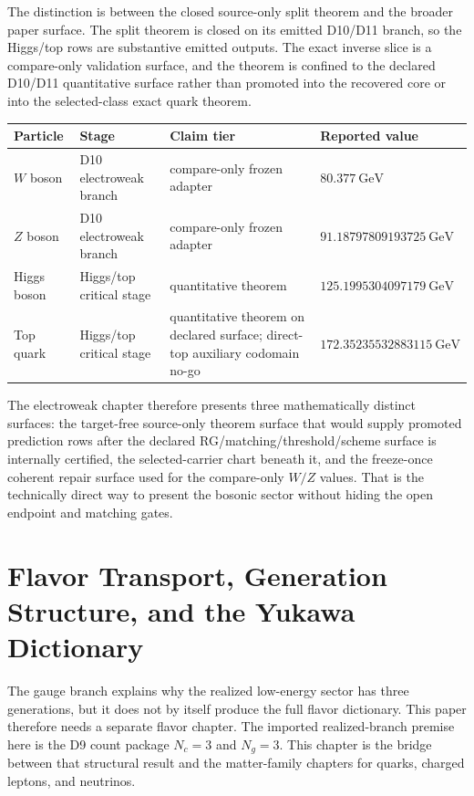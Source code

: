 \documentclass[11pt]{article}
\begin{document}
The distinction is between the closed source-only split theorem and the broader paper surface. The
split theorem is closed on its emitted D10/D11 branch, so the Higgs/top rows are
substantive emitted outputs. The exact inverse slice is a compare-only validation surface, and the theorem is confined to the declared D10/D11 quantitative surface rather than promoted into the recovered core or into the selected-class exact quark theorem.

\begin{table}[h]
\centering
\small
\begin{tabular}{@{}llll@{}}
\toprule
Particle & Stage & Claim tier & Reported value \\
\midrule
\(W\) boson & D10 electroweak branch & compare-only frozen adapter & \(80.377~\mathrm{GeV}\) \\
\(Z\) boson & D10 electroweak branch & compare-only frozen adapter & \(91.18797809193725~\mathrm{GeV}\) \\
Higgs boson & Higgs/top critical stage & quantitative theorem & \(125.1995304097179~\mathrm{GeV}\) \\
Top quark & Higgs/top critical stage & quantitative theorem on declared surface; direct-top auxiliary codomain no-go & \(172.35235532883115~\mathrm{GeV}\) \\
\bottomrule
\end{tabular}
\end{table}

The electroweak chapter therefore presents three mathematically distinct surfaces: the target-free
source-only theorem surface that would supply promoted prediction rows after the declared RG/matching/threshold/scheme surface is internally certified, the selected-carrier chart
beneath it, and the freeze-once coherent repair surface used for the compare-only \(W/Z\)
values. That is the technically direct way to present the bosonic sector without hiding the open
endpoint and matching gates.

\section{Flavor Transport, Generation Structure, and the Yukawa Dictionary}

The gauge branch explains why the realized low-energy sector has three generations, but it does
not by itself produce the full flavor dictionary. This paper therefore needs a
separate flavor chapter. The imported realized-branch premise here is the D9 count package
\(N_c=3\) and \(N_g=3\). This chapter is the bridge between that structural result and the
matter-family chapters for quarks, charged leptons, and neutrinos.
\end{document}
